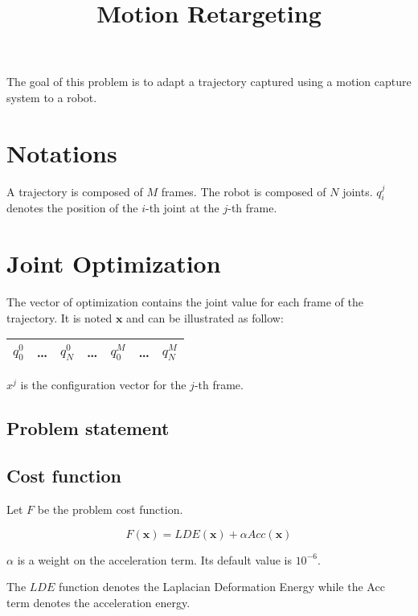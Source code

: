 \documentclass{article}
\title{Motion Retargeting}
\author{}
\date{}
\begin{document}
\maketitle

The goal of this problem is to adapt a trajectory captured using a
motion capture system to a robot.

\section{Notations}

A trajectory is composed of $M$ frames. The robot is composed of $N$
joints. $q_i^j$ denotes the position of the $i$-th joint at the $j$-th
frame.


\section{Joint Optimization}

The vector of optimization contains the joint value for each frame of
the trajectory. It is noted $\mathbf{x}$ and can be illustrated as
follow:


\begin{center}
  \begin{tabular}{|c c c | c | c c c|}
    \hline
    $q_0^0$ & \ldots & $q_N^0$ & \ldots & $q_0^M$ & \ldots & $q_N^M$\\
    \hline
  \end{tabular}
\end{center}

$x^j$ is the configuration vector for the $j$-th frame.


\subsection{Problem statement}

\subsection{Cost function}

Let $F$ be the problem cost function.

\begin{equation}
  F(\mathbf{x}) = {LDE}(\mathbf{x}) + \alpha {Acc}(\mathbf{x})
\end{equation}


$\alpha$ is a weight on the acceleration term. Its default value is
$10^{-6}$.

The $LDE$ function denotes the Laplacian Deformation Energy while the
Acc term denotes the acceleration energy.
\end{document}
